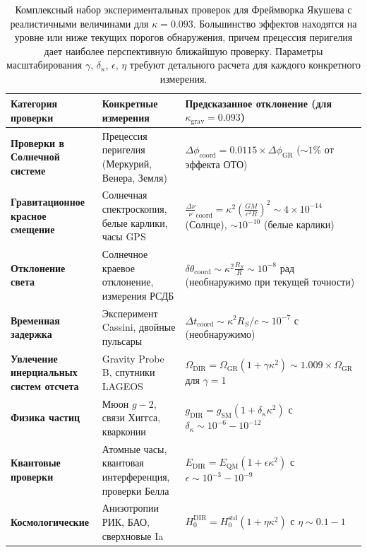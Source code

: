 \documentclass[11pt,a4paper]{article}
\begin{document}
	\begin{table}[htbp]
		\centering
		\scriptsize
		\begin{tabular}{p{}p{}p{}}
			\toprule
			\textbf{Категория проверки} & \textbf{Конкретные измерения} & \textbf{Предсказанное отклонение (для $\kappa_{\text{grav}} = 0.093$)} \\
			\midrule
			\textbf{Проверки в Солнечной системе} & 
			Прецессия перигелия (Меркурий, Венера, Земля) &
			$\Delta\phi_{\text{coord}} = 0.0115 \times \Delta\phi_{\text{GR}}$ ($\sim 1\%$ от эффекта ОТО) \\
			\hline
			\textbf{Гравитационное красное смещение} &
			Солнечная спектроскопия, белые карлики, часы GPS &
			$\frac{\Delta\nu}{\nu}_{\text{coord}} = \kappa^2\left(\frac{GM}{c^2R}\right)^2 \sim 4\times10^{-14}$ (Солнце), $\sim 10^{-10}$ (белые карлики) \\
			\hline
			\textbf{Отклонение света} &
			Солнечное краевое отклонение, измерения РСДБ &
			$\delta\theta_{\text{coord}} \sim \kappa^2 \frac{R_S}{R} \sim 10^{-8}$ рад (необнаружимо при текущей точности) \\
			\hline
			\textbf{Временная задержка} &
			Эксперимент Cassini, двойные пульсары &
			$\Delta t_{\text{coord}} \sim \kappa^2 R_S/c \sim 10^{-7}$ с (необнаружимо) \\
			\hline
			\textbf{Увлечение инерциальных систем отсчета} &
			Gravity Probe B, спутники LAGEOS &
			$\Omega_{\text{DIR}} = \Omega_{\text{GR}} (1 + \gamma \kappa^2) \sim 1.009 \times \Omega_{\text{GR}}$ для $\gamma=1$ \\
			\hline
			\textbf{Физика частиц} &
			Мюон $g-2$, связи Хиггса, кварконии &
			$g_{\text{DIR}} = g_{\text{SM}} (1 + \delta_\kappa \kappa^2)$ с $\delta_\kappa \sim 10^{-6} - 10^{-12}$ \\
			\hline
			\textbf{Квантовые проверки} &
			Атомные часы, квантовая интерференция, проверки Белла &
			$E_{\text{DIR}} = E_{\text{QM}} (1 + \epsilon \kappa^2)$ с $\epsilon \sim 10^{-3} - 10^{-9}$ \\
			\hline
			\textbf{Космологические} &
			Анизотропии РИК, БАО, сверхновые Ia &
			$H_0^{\text{DIR}} = H_0^{\text{std}} (1 + \eta \kappa^2)$ с $\eta \sim 0.1 - 1$ \\
			\bottomrule
		\end{tabular}
		\caption{Комплексный набор экспериментальных проверок для Фреймворка Якушева с реалистичными величинами для $\kappa = 0.093$. Большинство эффектов находятся на уровне или ниже текущих порогов обнаружения, причем прецессия перигелия дает наиболее перспективную ближайшую проверку. Параметры масштабирования $\gamma$, $\delta_\kappa$, $\epsilon$, $\eta$ требуют детального расчета для каждого конкретного измерения.}
	\end{table}
	
\end{document}
